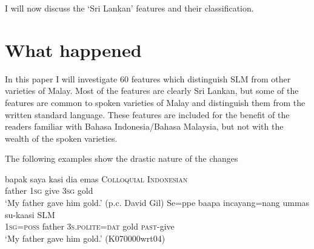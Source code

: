 I will now discuss the `Sri Lankan' features and their classification.
  

\section{What happened}

In this paper I will investigate 60 features which distinguish SLM from other varieties of Malay. Most of the features are clearly Sri Lankan, but some of the features are common to spoken varieties of Malay and distinguish them from the written standard language. These features are included for the benefit of the readers familiar with Bahasa Indonesia/Bahasa Malaysia, but not with the wealth of the spoken varieties.

The following examples show the drastic nature of the changes

% 
%  
% 
\ea
  \ea 
    \gll bapak saya kasi  dia emas  \textsc{Colloquial Indonesian}\\
	father 1\textsc{sg} give  3\textsc{sg} gold\\
	`My father gave him gold.' (p.c. David Gil) 
  \ex
    \gll Se=ppe    baapa incayang=nang    ummas su-kaasi \textsc{SLM} \\
	\textsc{1sg}=\textsc{poss} father \textsc{3s}.\textsc{polite}=\textsc{dat} gold \textsc{past}-give\\
`My father gave him gold.' (K070000wrt04)
  \z
\z    

